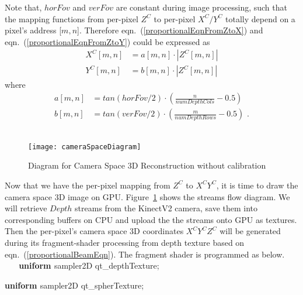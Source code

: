 \noindent
Note that, \(horFov\) and \(verFov\) are constant during image processing, such that the mapping functions from per-pixel \(Z^C\) to per-pixel \(X^C/Y^C\) totally depend on a pixel's address [\(m, n\)]. Therefore eqn.~(\ref{proportionalEqnFromZtoX}) and eqn.~(\ref{proportionalEqnFromZtoY}) could be expressed as 
%
\begin{equation}
\begin{aligned}
X^C[m, n] &= a[m, n] \cdot |Z^C[m, n]|
\\%
Y^C[m, n] &= b[m, n] \cdot |Z^C[m, n]| 
\end{aligned}
\label{proportionalBeamEqn}
\end{equation}%
\noindent
where
%
\begin{equation}
\begin{aligned}
a[m, n] &= tan(horFov / 2) \cdot (\frac{n}{numDepthCols} - 0.5)
\\%
b[m, n] &= tan(verFov / 2) \cdot (\frac{m}{numDepthRows} - 0.5) \, \, .
\end{aligned}
\label{parametersABofProportional}
\end{equation}%
\\\indent
%
\begin{figure}[!t]
\centering
\texttt{[image: cameraSpaceDiagram]}
\caption{Diagram for Camera Space 3D Reconstruction without calibration}
\label{cameraSpaceDiagram}
\end{figure}%
%
Now that we have the per-pixel mapping from \(Z^C\) to \(X^CY^C\), it is time to draw the camera space 3D image on GPU. Figure~\ref{cameraSpaceDiagram} shows the streams flow diagram. We will retrieve \(Depth\) streams from the KinectV2 camera, save them into corresponding buffers on CPU and upload the the streams onto GPU as textures. Then the per-pixel's camera space 3D coordinates \(X^CY^CZ^C\) will be generated during its fragment-shader processing from depth texture based on eqn.~(\ref{proportionalBeamEqn}). The fragment shader is programmed as below.
\\%
{\ttfamily
\textbf{\textcolor[rgb]{0.5019608,0.5019608,0.0}{\ \ \ uniform }}\textcolor[rgb]{0.7529412,0.7529412,0.7529412}{
 }\textcolor[rgb]{0.5019608,0.5019608,0.0}{sampler2D }\textcolor[rgb]{0.7529412,0.7529412,0.7529412}{
}qt\_depthTexture;\textcolor[rgb]{0.7529412,0.7529412,0.7529412}{
\ \ }}

{\ttfamily
\textbf{\textcolor[rgb]{0.5019608,0.5019608,0.0}{uniform }}\textcolor[rgb]{0.7529412,0.7529412,0.7529412}{
 }\textcolor[rgb]{0.5019608,0.5019608,0.0}{sampler2D }\textcolor[rgb]{0.7529412,0.7529412,0.7529412}{
}qt\_spherTexture;\textcolor[rgb]{0.7529412,0.7529412,0.7529412}{ \ }}


